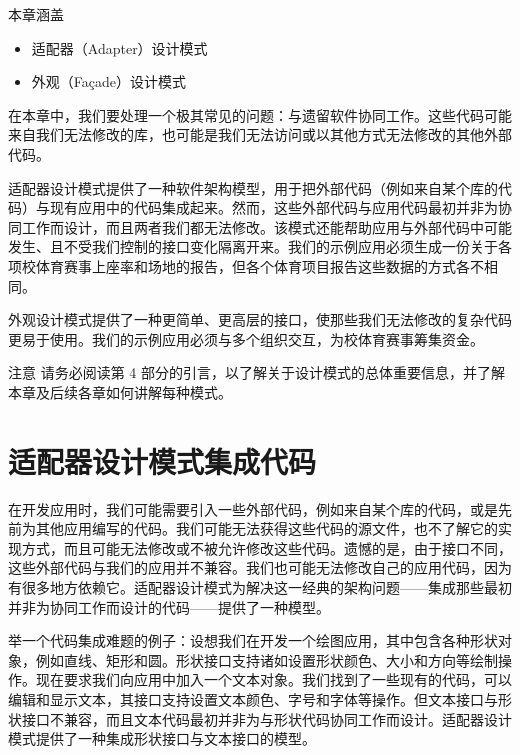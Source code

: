\begin{myChapterIntro}{本章涵盖}
\begin{itemize}
\item 适配器（Adapter）设计模式
\item 外观（Façade）设计模式
\end{itemize}
\end{myChapterIntro}

在本章中，我们要处理一个极其常见的问题：与遗留软件协同工作。这些代码可能来自我们无法修改的库，也可能是我们无法访问或以其他方式无法修改的其他外部代码。

适配器设计模式提供了一种软件架构模型，用于把外部代码（例如来自某个库的代码）与现有应用中的代码集成起来。然而，这些外部代码与应用代码最初并非为协同工作而设计，而且两者我们都无法修改。该模式还能帮助应用与外部代码中可能发生、且不受我们控制的接口变化隔离开来。我们的示例应用必须生成一份关于各项校体育赛事上座率和场地的报告，但各个体育项目报告这些数据的方式各不相同。


外观设计模式提供了一种更简单、更高层的接口，使那些我们无法修改的复杂代码更易于使用。我们的示例应用必须与多个组织交互，为校体育赛事筹集资金。

\begin{myWarning}{注意}
请务必阅读第 4 部分的引言，以了解关于设计模式的总体重要信息，并了解本章及后续各章如何讲解每种模式。
\end{myWarning}

\section{适配器设计模式集成代码}

在开发应用时，我们可能需要引入一些外部代码，例如来自某个库的代码，或是先前为其他应用编写的代码。我们可能无法获得这些代码的源文件，也不了解它的实现方式，而且可能无法修改或不被允许修改这些代码。遗憾的是，由于接口不同，这些外部代码与我们的应用并不兼容。我们也可能无法修改自己的应用代码，因为有很多地方依赖它。适配器设计模式为解决这一经典的架构问题——集成那些最初并非为协同工作而设计的代码——提供了一种模型。


举一个代码集成难题的例子：设想我们在开发一个绘图应用，其中包含各种形状对象，例如直线、矩形和圆。形状接口支持诸如设置形状颜色、大小和方向等绘制操作。现在要求我们向应用中加入一个文本对象。我们找到了一些现有的代码，可以编辑和显示文本，其接口支持设置文本颜色、字号和字体等操作。但文本接口与形状接口不兼容，而且文本代码最初并非为与形状代码协同工作而设计。适配器设计模式提供了一种集成形状接口与文本接口的模型。

